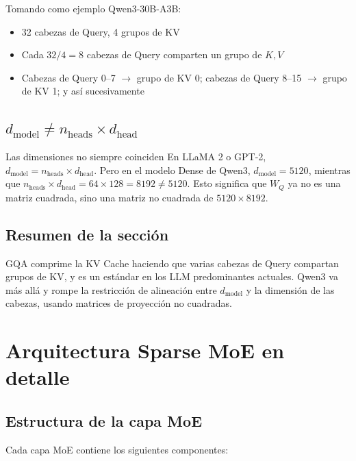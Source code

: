 \documentclass[a4paper]{article}
\begin{document}
Tomando como ejemplo Qwen3-30B-A3B:
\begin{itemize}
  \item 32 cabezas de Query, 4 grupos de KV
  \item Cada $32 / 4 = 8$ cabezas de Query comparten un grupo de $K, V$
  \item Cabezas de Query 0--7 $\to$ grupo de KV 0; cabezas de Query 8--15 $\to$ grupo de KV 1; y así sucesivamente
\end{itemize}

\subsection{$d_{\text{model}} \neq n_{\text{heads}} \times d_{\text{head}}$}

\begin{warningbox}{Las dimensiones no siempre coinciden}
En LLaMA 2 o GPT-2, $d_{\text{model}} = n_{\text{heads}} \times d_{\text{head}}$. Pero en el modelo Dense de Qwen3, $d_{\text{model}} = 5120$, mientras que $n_{\text{heads}} \times d_{\text{head}} = 64 \times 128 = 8192 \neq 5120$. Esto significa que $W_Q$ ya no es una matriz cuadrada, sino una matriz no cuadrada de $5120 \times 8192$.
\end{warningbox}

\subsection{Resumen de la sección}

GQA comprime la KV Cache haciendo que varias cabezas de Query compartan grupos de KV, y es un estándar en los LLM predominantes actuales. Qwen3 va más allá y rompe la restricción de alineación entre $d_{\text{model}}$ y la dimensión de las cabezas, usando matrices de proyección no cuadradas.

\section{Arquitectura Sparse MoE en detalle}

\subsection{Estructura de la capa MoE}

Cada capa MoE contiene los siguientes componentes:
\end{document}
